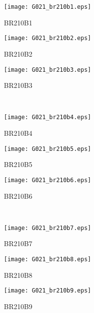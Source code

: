        		\begin{figure}[h]
       			\begin{subfigure}{.33\textwidth}
       				\centering
       				\texttt{[image: G021\_br210b1.eps]}
       				\caption{BR210B1}
       				\label{fig:sfig1}
       			\end{subfigure}%
       			\begin{subfigure}{.33\textwidth}
       				\centering
       				\texttt{[image: G021\_br210b2.eps]}
       				\caption{BR210B2}
       			\end{subfigure}%
       			\begin{subfigure}{.33\textwidth}
       				\centering
       				\texttt{[image: G021\_br210b3.eps]}
       				\caption{BR210B3}
       			\end{subfigure}
       			~
       			\begin{subfigure}{.33\textwidth}
       				\centering
       				\texttt{[image: G021\_br210b4.eps]}
       				\caption{BR210B4}
       			\end{subfigure}%
       			\begin{subfigure}{.33\textwidth}
       				\centering
       				\texttt{[image: G021\_br210b5.eps]}
       				\caption{BR210B5}
       			\end{subfigure}%
       			\begin{subfigure}{.33\textwidth}
       				\centering
       				\texttt{[image: G021\_br210b6.eps]}
       				\caption{BR210B6}
       			\end{subfigure}
       			~
       			\begin{subfigure}{.33\textwidth}
       				\centering
       				\texttt{[image: G021\_br210b7.eps]}
       				\caption{BR210B7}
       			\end{subfigure}%
       			\begin{subfigure}{.33\textwidth}
       				\centering
       				\texttt{[image: G021\_br210b8.eps]}
       				\caption{BR210B8}
       			\end{subfigure}%
       			\begin{subfigure}{.33\textwidth}
       				\centering
       				\texttt{[image: G021\_br210b9.eps]}
       				\caption{BR210B9}
       			\end{subfigure}
       			~
       			\begin{subfigure}{.33\textwidth}

\end{subfigure}
\end{figure}
